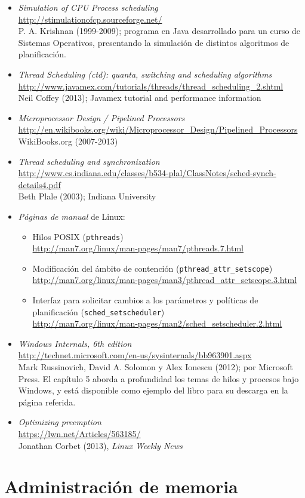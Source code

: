 \documentclass[11pt,fleqn]{book} %
\newcommand{\otrorec}[1]{ \\ {\small \url{#1}} \\ }
\begin{document}
\begin{itemize}
\item \emph{Simulation of CPU Process scheduling}
  \otrorec{http://stimulationofcp.sourceforge.net/}
  P. A. Krishnan
  (1999-2009); programa en Java desarrollado para un curso de Sistemas
  Operativos, presentando la simulación de distintos algoritmos de
  planificación.
\item \emph{Thread Scheduling (ctd): quanta, switching and scheduling   algorithms}
  \otrorec{http://www.javamex.com/tutorials/threads/thread_scheduling_2.shtml}
  Neil Coffey (2013); Javamex tutorial and performance information
\item \emph{Microprocessor Design / Pipelined Processors}
  \otrorec{http://en.wikibooks.org/wiki/Microprocessor_Design/Pipelined_Processors}
  WikiBooks.org (2007-2013)
\item \emph{Thread scheduling and synchronization}
  \otrorec{http://www.cs.indiana.edu/classes/b534-plal/ClassNotes/sched-synch-details4.pdf}
  Beth Plale (2003); Indiana University
\item \emph{Páginas de manual} de Linux:
\begin{itemize}
\item Hilos POSIX (\texttt{pthreads})
    \otrorec{http://man7.org/linux/man-pages/man7/pthreads.7.html}
\item Modificación del ámbito de contención (\texttt{pthread\_attr\_setscope})
    \otrorec{http://man7.org/linux/man-pages/man3/pthread_attr_setscope.3.html}
\item Interfaz para solicitar cambios a los parámetros y políticas de
    planificación (\texttt{sched\_setscheduler})
    \otrorec{http://man7.org/linux/man-pages/man2/sched_setscheduler.2.html}
\end{itemize}
\item \emph{Windows Internals, 6th edition}
  \otrorec{http://technet.microsoft.com/en-us/sysinternals/bb963901.aspx}
  Mark Russinovich, David A. Solomon y Alex Ionescu (2012); por
  Microsoft Press. El capítulo 5 aborda a profundidad los temas de
  hilos y procesos bajo Windows, y está disponible como ejemplo del
  libro para su descarga en la página referida.
\item \emph{Optimizing preemption}
  \otrorec{https://lwn.net/Articles/563185/}
  Jonathan Corbet (2013), \emph{Linux Weekly News}
\end{itemize}
\chapter{Administración de memoria}
\label{sec-5}
\end{document}
